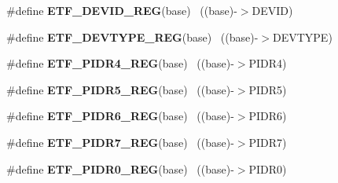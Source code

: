 \begin{DoxyCompactItemize}
\item 
\hypertarget{group___e_t_f___register___accessor___macros_ga67993c3d2a89be881d7cf6e9376262dd}{}\#define {\bfseries E\+T\+F\+\_\+\+D\+E\+V\+I\+D\+\_\+\+R\+E\+G}(base)                                        ~((base)-\/$>$D\+E\+V\+I\+D)\label{group___e_t_f___register___accessor___macros_ga67993c3d2a89be881d7cf6e9376262dd}

\item 
\hypertarget{group___e_t_f___register___accessor___macros_ga4a325b20038d673fb3ce3315d92447c8}{}\#define {\bfseries E\+T\+F\+\_\+\+D\+E\+V\+T\+Y\+P\+E\+\_\+\+R\+E\+G}(base)                                    ~((base)-\/$>$D\+E\+V\+T\+Y\+P\+E)\label{group___e_t_f___register___accessor___macros_ga4a325b20038d673fb3ce3315d92447c8}

\item 
\hypertarget{group___e_t_f___register___accessor___macros_gaa7e3cd7e6ebe630d04469253ef74edff}{}\#define {\bfseries E\+T\+F\+\_\+\+P\+I\+D\+R4\+\_\+\+R\+E\+G}(base)                                        ~((base)-\/$>$P\+I\+D\+R4)\label{group___e_t_f___register___accessor___macros_gaa7e3cd7e6ebe630d04469253ef74edff}

\item 
\hypertarget{group___e_t_f___register___accessor___macros_gad07bd35743dda4c65ffc83da3c02c1c8}{}\#define {\bfseries E\+T\+F\+\_\+\+P\+I\+D\+R5\+\_\+\+R\+E\+G}(base)                                        ~((base)-\/$>$P\+I\+D\+R5)\label{group___e_t_f___register___accessor___macros_gad07bd35743dda4c65ffc83da3c02c1c8}

\item 
\hypertarget{group___e_t_f___register___accessor___macros_gadb758d0aa38d644a432e5dd9978d212f}{}\#define {\bfseries E\+T\+F\+\_\+\+P\+I\+D\+R6\+\_\+\+R\+E\+G}(base)                                        ~((base)-\/$>$P\+I\+D\+R6)\label{group___e_t_f___register___accessor___macros_gadb758d0aa38d644a432e5dd9978d212f}

\item 
\hypertarget{group___e_t_f___register___accessor___macros_ga6091662320901cb89249b5e681300fd9}{}\#define {\bfseries E\+T\+F\+\_\+\+P\+I\+D\+R7\+\_\+\+R\+E\+G}(base)                                        ~((base)-\/$>$P\+I\+D\+R7)\label{group___e_t_f___register___accessor___macros_ga6091662320901cb89249b5e681300fd9}

\item 
\hypertarget{group___e_t_f___register___accessor___macros_ga9e41167372f1530189363d41dbbfd95f}{}\#define {\bfseries E\+T\+F\+\_\+\+P\+I\+D\+R0\+\_\+\+R\+E\+G}(base)                                        ~((base)-\/$>$P\+I\+D\+R0)\label{group___e_t_f___register___accessor___macros_ga9e41167372f1530189363d41dbbfd95f}


\end{DoxyCompactItemize}
